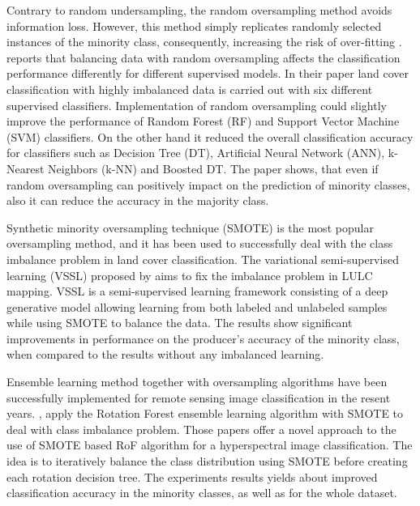 \documentclass[parskip=full]{scrartcl}
\begin{document}
Contrary to random undersampling, the random oversampling method avoids
information loss. However, this method simply replicates randomly selected
instances of the minority class, consequently, increasing the risk of
over-fitting \cite{Krawczyk2016}. \cite{Maxwell2018} reports that balancing
data with random oversampling affects the classification performance
differently for different supervised models. In their paper land cover
classification with highly imbalanced data is carried out with six different
supervised classifiers. Implementation of random oversampling could slightly
improve the performance of Random Forest (RF) and Support Vector Machine (SVM)
classifiers. On the other hand it reduced the overall classification accuracy
for classifiers such as Decision Tree (DT), Artificial Neural Network (ANN),
k-Nearest Neighbors (k-NN) and Boosted DT. The paper shows, that even if random
oversampling can positively impact on the prediction of minority classes,
also it can reduce the accuracy in the majority class.

Synthetic minority oversampling technique (SMOTE) \cite{Chawla2002} is the most
popular oversampling method, and it has been used to successfully deal with the
class imbalance problem in land cover classification. The variational
semi-supervised learning (VSSL) proposed by \cite{Cenggoro2018} aims to fix the
imbalance problem in LULC mapping. VSSL is a semi-supervised learning framework
consisting of a deep generative model allowing learning from both labeled
and unlabeled samples while using SMOTE to balance the data. The results show
significant improvements in performance on the producer’s accuracy of the
minority class, when compared to the results without any imbalanced learning.

Ensemble learning method together with oversampling algorithms have been
successfully implemented for remote sensing image classification in the resent
years. \cite{Feng2018}, \cite{Feng2019} apply the Rotation Forest ensemble
learning algorithm with SMOTE to deal with class imbalance problem. Those
papers offer a novel approach to the use of SMOTE based RoF algorithm for a
hyperspectral image classification. The idea is to iteratively balance the
class distribution using SMOTE before creating each rotation decision tree.
The experiments results yields about improved classification accuracy in the
minority classes,  as well as for the whole dataset.
\end{document}
